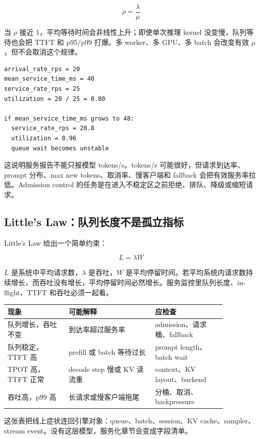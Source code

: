 \[
\rho = \frac{\lambda}{\mu}
\]

当 \(\rho\) 接近 1，平均等待时间会非线性上升；即使单次推理 kernel 没变慢，队列等待也会把 TTFT 和 p95/p99 打爆。多 worker、多 GPU、多 batch 会改变有效 \(\mu\)，但不会取消这个规律。

\begin{lstlisting}[numbers=none,caption={一个最小 SLO 账本}]
arrival_rate_rps = 20
mean_service_time_ms = 40
service_rate_rps = 25
utilization = 20 / 25 = 0.80

if mean_service_time_ms grows to 48:
  service_rate_rps = 20.8
  utilization = 0.96
  queue wait becomes unstable
\end{lstlisting}

这说明服务报告不能只报模型 tokens/s。tokens/s 可能很好，但请求到达率、prompt 分布、max new tokens、取消率、慢客户端和 fallback 会把有效服务率拉低。Admission control 的任务是在进入不稳定区之前拒绝、排队、降级或缩短请求。

\subsection{Little's Law：队列长度不是孤立指标}

Little's Law 给出一个简单约束：

\[
L = \lambda W
\]

\(L\) 是系统中平均请求数，\(\lambda\) 是吞吐，\(W\) 是平均停留时间。若平均系统内请求数持续增长，而吞吐没有增长，平均停留时间必然增长。服务监控里队列长度、in-flight、TTFT 和吞吐必须一起看。

\begin{center}
\begin{tabular}{p{0.24\linewidth}p{0.34\linewidth}p{0.28\linewidth}}
\toprule
现象 & 可能解释 & 应检查 \\
\midrule
队列增长，吞吐不变 & 到达率超过服务率 & admission、请求桶、fallback \\
队列稳定，TTFT 高 & prefill 或 batch 等待过长 & prompt length、batch wait \\
TPOT 高，TTFT 正常 & decode step 慢或 KV 读流重 & context、KV layout、backend \\
吞吐高，p99 高 & 长请求或慢客户端拖尾 & 分桶、取消、backpressure \\
\bottomrule
\end{tabular}
\end{center}

这张表把线上症状连回引擎对象：queue、batch、session、KV cache、sampler、stream event。没有这层模型，服务化章节会变成字段清单。


